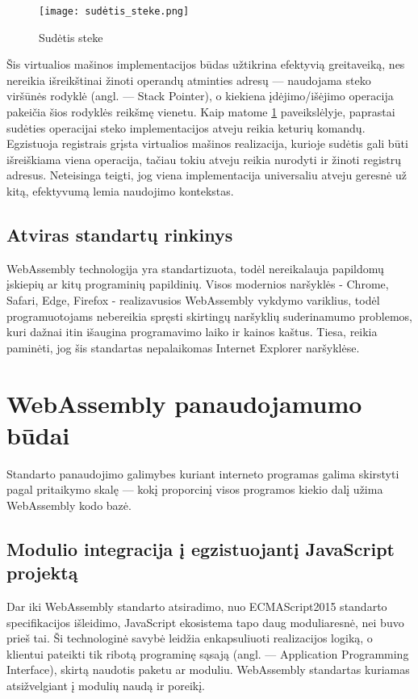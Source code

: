 \documentclass{VUMIFPSkursinis}
\begin{document}
\begin{figure}[h!]
  \begin{center}
  \texttt{[image: sudėtis\_steke.png]}
  \end{center}
  \caption{Sudėtis steke}
  \label{fig:stack_addition}
\end{figure}

Šis virtualios mašinos implementacijos būdas užtikrina efektyvią greitaveiką, nes nereikia išreikštinai žinoti operandų atminties adresų — naudojama steko viršūnės rodyklė (angl. — Stack Pointer), o kiekiena įdėjimo/išėjimo operacija pakeičia šios rodyklės reikšmę vienetu.
Kaip matome \ref{fig:stack_addition} paveikslėlyje, paprastai sudėties operacijai steko implementacijos atveju reikia keturių komandų. Egzistuoja registrais grįsta virtualios mašinos realizacija, kurioje sudėtis gali būti išreiškiama viena operacija, tačiau tokiu atveju reikia nurodyti ir žinoti registrų adresus. \cite{MSS12} Neteisinga teigti, jog viena implementacija universaliu atveju geresnė už kitą, efektyvumą lemia naudojimo kontekstas.

\subsection{Atviras standartų rinkinys}
WebAssembly technologija yra standartizuota, todėl nereikalauja papildomų įskiepių ar kitų programinių papildinių. Visos modernios naršyklės - Chrome, Safari, Edge, Firefox - realizavusios WebAssembly vykdymo variklius, todėl programuotojams nebereikia spręsti skirtingų naršyklių suderinamumo problemos, kuri dažnai itin išaugina programavimo laiko ir kainos kaštus. Tiesa, reikia paminėti, jog šis standartas nepalaikomas Internet Explorer naršyklėse. 
\section{WebAssembly panaudojamumo būdai}
Standarto panaudojimo galimybes kuriant interneto programas galima skirstyti pagal pritaikymo skalę — kokį proporcinį visos programos kiekio dalį užima WebAssembly kodo bazė.

\subsection{Modulio integracija į egzistuojantį JavaScript projektą}
Dar iki WebAssembly standarto atsiradimo, nuo ECMAScript2015 standarto specifikacijos išleidimo, JavaScript ekosistema tapo daug moduliaresnė, nei buvo prieš tai. Ši technologinė savybė leidžia enkapsuliuoti realizacijos logiką, o klientui pateikti tik ribotą programinę sąsają (angl. — Application Programming Interface), skirtą naudotis paketu ar moduliu. WebAssembly standartas kuriamas atsižvelgiant į modulių naudą ir poreikį.
\end{document}
